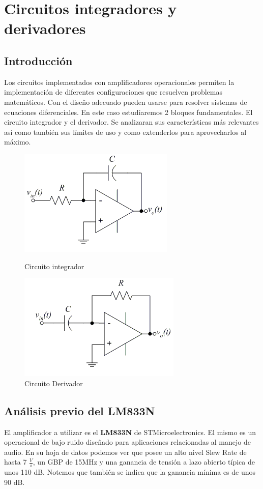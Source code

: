 \documentclass[a4paper]{article}
\begin{document}
\section{Circuitos integradores y derivadores}
\subsection{Introducción}
Los circuitos implementados con amplificadores operacionales permiten la implementación de diferentes configuraciones que resuelven problemas matemáticos. Con el diseño adecuado pueden usarse para resolver sistemas de ecuaciones diferenciales.
En este caso estudiaremos 2 bloques fundamentales. El circuito integrador y el derivador. Se analizaran sus características más relevantes así como también sus límites de uso y como extenderlos para aprovecharlos al máximo.

\begin{figure}[hbt!]
	\includegraphics[scale=1]{Ejercicio4/integrador.png}
	\caption{Circuito integrador} 
	
	\includegraphics{Ejercicio4/derivador}
	\caption{Circuito Derivador} 
	
\end{figure}

\subsection{Análisis previo del \textbf{LM833N}}
El amplificador a utilizar es el \textbf{LM833N} de STMicroelectronics. El mismo es un operacional de bajo ruido diseñado para aplicaciones relacionadas al manejo de audio.
En su hoja de datos podemos ver que posee un alto nivel Slew Rate de hasta 7 $\frac{V}{s}$, un GBP de 15MHz y una ganancia de tensión 
a lazo abierto típica de unos 110 dB. Notemos que también se indica que la ganancia mínima es de unos 90 dB. 
\end{document}
